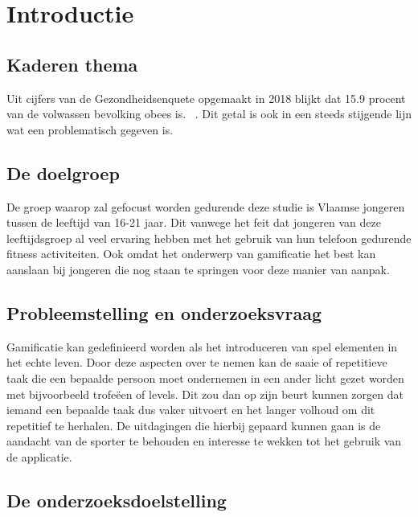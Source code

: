 
\section{Introductie}%
\label{sec:introductie}

\subsection{Kaderen thema}

Uit cijfers van de Gezondheidsenquete opgemaakt in 2018 blijkt dat 15.9 procent van de volwassen bevolking obees is. ~\autocite{Drieskens2018}.  Dit getal is ook in een steeds stijgende lijn wat een problematisch gegeven is. 

\subsection{De doelgroep}

De groep waarop zal gefocust worden gedurende deze studie is Vlaamse jongeren tussen de leeftijd van 16-21 jaar. Dit vanwege het feit dat jongeren van deze leeftijdsgroep al veel ervaring hebben met het gebruik van hun telefoon gedurende fitness activiteiten. Ook omdat het onderwerp van gamificatie het best kan aanslaan bij jongeren die nog staan te springen voor deze manier van aanpak.

\subsection{Probleemstelling en onderzoeksvraag}

Gamificatie kan gedefinieerd worden als het introduceren van spel elementen in het echte leven. \autocite{Deterding2011} Door deze aspecten over te nemen kan de saaie of repetitieve taak die een bepaalde persoon moet ondernemen in een ander licht gezet worden met bijvoorbeeld trofeëen of levels. Dit zou dan op zijn beurt kunnen zorgen dat iemand een bepaalde taak dus vaker uitvoert en het langer volhoud om dit repetitief te herhalen. De uitdagingen die hierbij gepaard kunnen gaan is de aandacht van de sporter te behouden en interesse te wekken tot het gebruik van de applicatie. 

\subsection{De onderzoeksdoelstelling}

